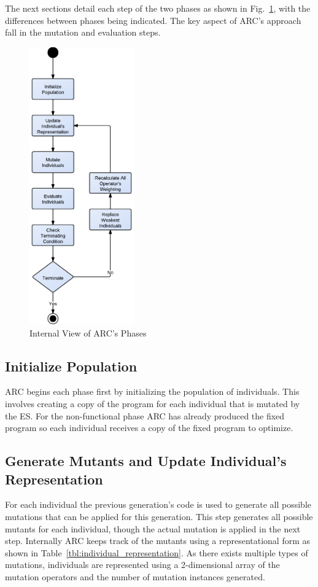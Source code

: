 \documentclass{llncs}
\begin{document}
The next sections detail each step of the two phases as shown in
Fig.~\ref{fig:phases_internals}, with the differences between phases being
indicated. The key aspect of ARC's approach fall in the mutation and evaluation
steps.

\begin{figure}[h]
  \centering
  \includegraphics[width=4.50cm]{figures/phases.pdf}
  \caption{Internal View of ARC's Phases}
  \label{fig:phases_internals}
\end{figure}

\subsection{Initialize Population}
\label{sec:initialize_population}

ARC begins each phase first by initializing the population of individuals. This
involves creating a copy of the program for each individual that is mutated by
the ES. For the non-functional phase ARC has already produced the fixed
program so each individual receives a copy of the fixed program to optimize.

\subsection{Generate Mutants and Update Individual's Representation}
\label{sec:update_individual_representation}

For each individual the previous generation's code is used to generate all
possible mutations that can be applied for this generation. This step generates
all possible mutants for each individual, though the actual mutation is applied
in the next step. Internally ARC keeps track of the mutants using a
representational form as shown in Table~\ref{tbl:individual_representation}. As
there exists multiple types of mutations, individuals are represented using a
2-dimensional array of the mutation operators and the number of mutation
instances generated.
\end{document}
